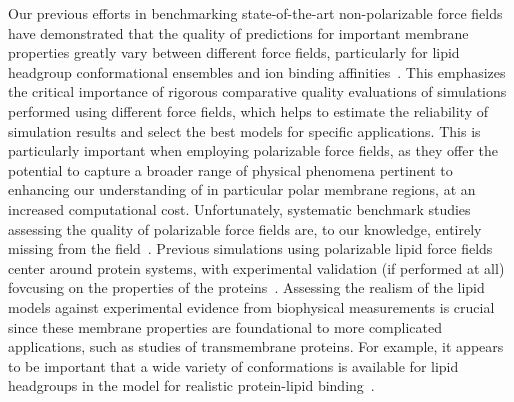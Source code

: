 \documentclass[journal=jacsat,manuscript=article,layout=singlecolumn]{achemso}
\begin{document}

Our previous efforts in benchmarking state-of-the-art non-polarizable force fields have demonstrated that the quality of predictions for important membrane properties greatly vary between different force fields, particularly for lipid headgroup conformational ensembles and ion binding affinities~\cite{Botan2015,Catte2016,Antila2019,bacle21,Antila2021,Antila2022,Databank}. This emphasizes the critical importance of rigorous comparative quality evaluations of simulations performed using different force fields, which helps to estimate the reliability of simulation results and select the best models for specific applications. This is particularly important when employing polarizable force fields, as they offer the potential to capture a broader range of physical phenomena pertinent to enhancing our understanding of in particular polar membrane regions, at an increased computational cost. Unfortunately, systematic benchmark studies assessing the quality of polarizable force fields are,  
to our knowledge, entirely missing from the field~\cite{inakollu2020polarisable,jing2019polarizable,baker2015polarizable}. Previous simulations using polarizable lipid force fields center around protein systems, with experimental validation (if performed at all) fovcusing on the properties of the proteins~\cite{jing2019polarizable, Lynch21}. Assessing the realism of the lipid models against experimental evidence from biophysical measurements is crucial since these membrane properties are foundational to more complicated applications, such as studies of transmembrane proteins. For example, it appears to be important that a wide variety of conformations is available for lipid headgroups in the model for realistic protein-lipid binding~\cite{bacle21}.
\end{document}
